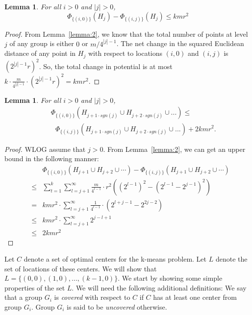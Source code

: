 \documentclass[11pt]{article}
\newtheorem{lemma}[theorem]{Lemma}
\begin{document}
\begin{lemma}\label{lemma:3}
For all $i > 0$ and $|j| > 0$, \begin{equation*}
	\Phi_{\{(i, 0)\}}(H_{j})  - \Phi_{\{(i, j)\}}(H_{j}) \leq kmr^2
\end{equation*}
\end{lemma}
\begin{proof}
From Lemma~\ref{lemma:2}, we know that the total number of points at level $j$ of any group is either $0$ or $m/4^{|j|-1}$. 
The net change in the squared Euclidean distance of any point in $H_j$ with respect to locations $(i, 0)$ and $(i, j)$ is $(2^{|j|-1} r)^2$. 
So, the total change in potential is at most $k \cdot \frac{m}{4^{|j|-1}} \cdot (2^{|j|-1} r)^2 = k m r^2$.
\end{proof}

\begin{lemma}\label{lemma:4}
For all $i > 0$ and $|j| > 0$,  
\begin{eqnarray*}
&&\Phi_{\{(i, 0)\}}(H_{j+1\cdot sgn(j)} \cup H_{j+2\cdot sgn(j)} \cup ...) \leq\\
&&~~~\Phi_{\{(i, j)\}}(H_{j+1\cdot sgn(j)} \cup H_{j+2\cdot sgn(j)} \cup ...)+2kmr^2.
\end{eqnarray*}
\end{lemma}
\begin{proof}
WLOG assume that $j > 0$. 
From Lemma~\ref{lemma:2}, we can get an upper bound in the following manner:
\begin{eqnarray*}
&&\!\!\!\!\!\!\!\!\!\!\Phi_{\{(i, 0)\}}(H_{j+1} \cup H_{j+2} \cup \cdots) - \Phi_{\{(i, j)\}}(H_{j+1} \cup H_{j+2} \cup \cdots) \\
&\leq& \sum_{t=1}^{k} \sum_{l=j+1}^{\infty} \frac{m}{4^{l-1}} \cdot r^2 \left((2^{l-1})^2 - (2^{l-1} - 2^{j-1})^2\right) \\
&=& k m r^2 \cdot  \sum_{l=j+1}^{\infty} \frac{1}{4^{l-1}} \cdot \left(2^{l+j-1} - 2^{2j-2}\right) \\
&\leq& k m r^2 \cdot  \sum_{l=j+1}^{\infty} 2^{j - l + 1} \\
&\leq& 2 k m r^2
\end{eqnarray*}
\end{proof}

Let $C$ denote a set of optimal centers for the k-means problem. 
Let $L$ denote the set of locations of these centers.
We will show that $L = \{(0, 0), (1, 0), ..., (k-1, 0)\}$.
We start by showing some simple properties of the set $L$.
We will need the following additional definitions:
We say that a group $G_i$ is {\em covered} with respect to $C$ if $C$ has at least one center from group $G_i$. Group $G_i$ is said to be {\em uncovered} otherwise.
\end{document}
